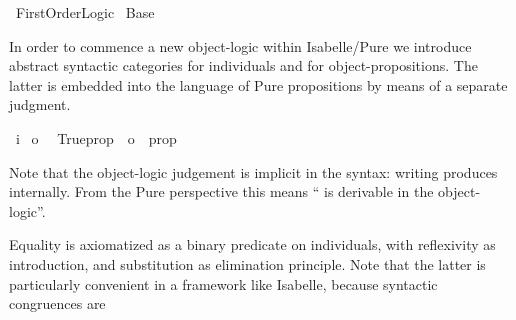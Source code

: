 %
\begin{isabellebody}%
\def\isabellecontext{First{\isaliteral{5F}{\isacharunderscore}}Order{\isaliteral{5F}{\isacharunderscore}}Logic}%
%
\isamarkuptrue%
%
\isadelimvisible
%
\endisadelimvisible
%
\isatagvisible
{}\isamarkupfalse%
\ First{}Order{}Logic\isanewline
{}\ Base\ \ \isanewline
{}%
\endisatagvisible
{\isafoldvisible}%
%
\isadelimvisible
%
\endisadelimvisible
%
\begin{isamarkuptext}%
\noindent In order to commence a new object-logic within
  Isabelle/Pure we introduce abstract syntactic categories 
  for individuals and  for object-propositions.  The latter
  is embedded into the language of Pure propositions by means of a
  separate judgment.%
\end{isamarkuptext}%
\isamarkuptrue%
\isamarkupfalse%
\ i\isanewline
{}\isamarkupfalse%
\ o\isanewline
\isanewline
{}\isamarkupfalse%
\isanewline
\ \ Trueprop\ {}{}\ {}o\ {}\ prop{}\ \ \ \ {}{}{}{}\ {}{}%
\begin{isamarkuptext}%
\noindent Note that the object-logic judgement is implicit in the
  syntax: writing  produces  internally.
  From the Pure perspective this means `` is derivable in the
  object-logic''.%
\end{isamarkuptext}%
\isamarkuptrue%
%
\isamarkuptrue%
%
\begin{isamarkuptext}%
Equality is axiomatized as a binary predicate on individuals, with
  reflexivity as introduction, and substitution as elimination
  principle.  Note that the latter is particularly convenient in a
  framework like Isabelle, because syntactic congruences are

\end{isamarkuptext}
\end{isabellebody}
